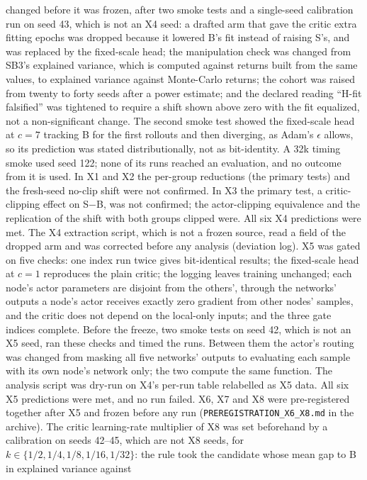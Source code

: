 changed before it was frozen, after two smoke tests and a single-seed calibration run on seed 43, which is not an X4 seed:
a drafted arm that gave the critic extra fitting epochs was dropped because it lowered B's fit instead of raising S's,
and was replaced by the fixed-scale head; the manipulation check was changed from SB3's explained variance, which is
computed against returns built from the same values, to explained variance against Monte-Carlo returns; the cohort
was raised from twenty to forty seeds after a power estimate; and the declared reading ``H-fit falsified'' was tightened
to require a shift shown above zero with the fit equalized, not a non-significant change. The second smoke test showed
the fixed-scale head at $c=7$ tracking B for the first rollouts and then diverging, as Adam's $\epsilon$ allows, so its
prediction was stated distributionally, not as bit-identity. A 32k timing smoke used seed 122; none of its runs
reached an evaluation, and no outcome from it is used. In X1 and X2 the per-group reductions
(the primary tests) and the fresh-seed no-clip shift were not confirmed. In X3 the primary test, a critic-clipping
effect on S$-$B, was not confirmed; the actor-clipping equivalence and the replication of the shift with both groups
clipped were. All six X4 predictions were met. The X4 extraction script, which is not a frozen source, read a field of
the dropped arm and was corrected before any analysis (deviation log). X5 was gated on five checks: one index run twice
gives bit-identical results; the fixed-scale head at $c=1$ reproduces the plain critic; the logging leaves training
unchanged; each node's actor parameters are disjoint from the others', through the networks' outputs a node's actor receives exactly zero gradient
from other nodes' samples, and the critic does not depend on the local-only inputs; and the three gate indices
complete. Before the freeze, two smoke tests on seed 42, which is not an X5 seed, ran these checks and timed the runs.
Between them the actor's routing was changed from masking all five networks' outputs to evaluating each sample with its
own node's network only; the two compute the same function. The analysis script was dry-run on X4's per-run table
relabelled as X5 data. All six X5 predictions were met, and no run failed. X6, X7 and X8
were pre-registered together after X5 and frozen before any run (\texttt{PREREGISTRATION\_X6\_X8.md} in the archive). The
critic learning-rate multiplier of X8 was set beforehand by a calibration on seeds 42--45, which are not X8 seeds,
for $k\in\{1/2,1/4,1/8,1/16,1/32\}$: the rule took the candidate whose mean gap to B in explained variance against
